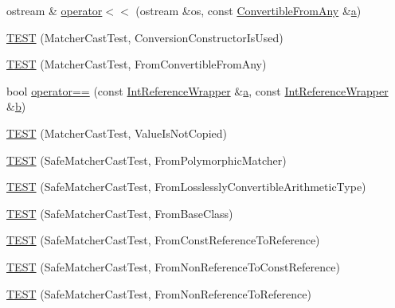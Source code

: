 \begin{DoxyCompactItemize}
\item 
ostream \& \hyperlink{namespacetesting_1_1gmock__matchers__test_a2a2abd1e49c201ae26ed96211d4225eb}{operator$<$$<$} (ostream \&os, const \hyperlink{structtesting_1_1gmock__matchers__test_1_1_convertible_from_any}{Convertible\+From\+Any} \&\hyperlink{_07copy_08_2_read_camera_model_8m_a551a3d351eadcc0b9b1a2f24f0fb5ea0}{a})
\item 
\hyperlink{namespacetesting_1_1gmock__matchers__test_a42e4d7d26704516436281897cb41bb1b}{T\+E\+ST} (Matcher\+Cast\+Test, Conversion\+Constructor\+Is\+Used)
\item 
\hyperlink{namespacetesting_1_1gmock__matchers__test_ae51787fccc0f0a27e3725039c6cd48dc}{T\+E\+ST} (Matcher\+Cast\+Test, From\+Convertible\+From\+Any)
\item 
bool \hyperlink{namespacetesting_1_1gmock__matchers__test_a33c068c32bf5118e5be92771b146db77}{operator==} (const \hyperlink{structtesting_1_1gmock__matchers__test_1_1_int_reference_wrapper}{Int\+Reference\+Wrapper} \&\hyperlink{_07copy_08_2_read_camera_model_8m_a551a3d351eadcc0b9b1a2f24f0fb5ea0}{a}, const \hyperlink{structtesting_1_1gmock__matchers__test_1_1_int_reference_wrapper}{Int\+Reference\+Wrapper} \&\hyperlink{jquery_8js_a2fa551895933fae935a0a6b87282241d}{b})
\item 
\hyperlink{namespacetesting_1_1gmock__matchers__test_ae99c08c8a815964b61f98a4785cf79b5}{T\+E\+ST} (Matcher\+Cast\+Test, Value\+Is\+Not\+Copied)
\item 
\hyperlink{namespacetesting_1_1gmock__matchers__test_a29c04361c022a71711dbf9d3cf2a5050}{T\+E\+ST} (Safe\+Matcher\+Cast\+Test, From\+Polymorphic\+Matcher)
\item 
\hyperlink{namespacetesting_1_1gmock__matchers__test_a70bbe53742db988a828d9e8201e34770}{T\+E\+ST} (Safe\+Matcher\+Cast\+Test, From\+Losslessly\+Convertible\+Arithmetic\+Type)
\item 
\hyperlink{namespacetesting_1_1gmock__matchers__test_a937469149aee65efde526091af1e4f78}{T\+E\+ST} (Safe\+Matcher\+Cast\+Test, From\+Base\+Class)
\item 
\hyperlink{namespacetesting_1_1gmock__matchers__test_a14ba7c67551222321056e4da6708010f}{T\+E\+ST} (Safe\+Matcher\+Cast\+Test, From\+Const\+Reference\+To\+Reference)
\item 
\hyperlink{namespacetesting_1_1gmock__matchers__test_ad53741423311d4f76d9d980f59ec8d65}{T\+E\+ST} (Safe\+Matcher\+Cast\+Test, From\+Non\+Reference\+To\+Const\+Reference)
\item 
\hyperlink{namespacetesting_1_1gmock__matchers__test_a362ce5b2b395dfd6363e4d80b49951f1}{T\+E\+ST} (Safe\+Matcher\+Cast\+Test, From\+Non\+Reference\+To\+Reference)

\end{DoxyCompactItemize}
